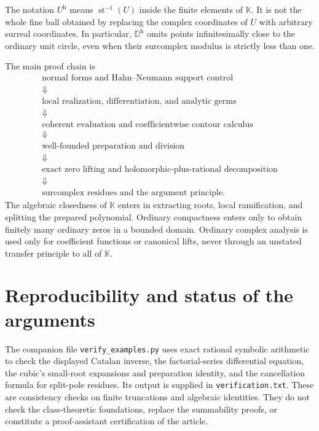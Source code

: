 \documentclass[11pt,a4paper]{article}
\theoremstyle{definition}\newtheorem{definition}[theorem]{Definition}
\theoremstyle{remark}\newtheorem{remark}[theorem]{Remark}
\newcommand{\K}{\mathbb K}
\newcommand{\st}{\operatorname{st}}\newcommand{\supp}{\operatorname{supp}}
\numberwithin{equation}{section}
\begin{document}
The notation $U^{\mathrm h}$ means $\st^{-1}(U)$ inside the finite elements of $\K$. It is not the whole fine ball obtained by replacing the complex coordinates of $U$ with arbitrary surreal coordinates. In particular, $\mathbb D^{\mathrm h}$ omits points infinitesimally close to the ordinary unit circle, even when their surcomplex modulus is strictly less than one.

The main proof chain is
\[
\begin{gathered}
 \text{normal forms and Hahn--Neumann support control}\\
 \Downarrow\\
 \text{local realization, differentiation, and analytic germs}\\
 \Downarrow\\
 \text{coherent evaluation and coefficientwise contour calculus}\\
 \Downarrow\\
 \text{well-founded preparation and division}\\
 \Downarrow\\
 \text{exact zero lifting and holomorphic-plus-rational decomposition}\\
 \Downarrow\\
 \text{surcomplex residues and the argument principle}.
\end{gathered}
\]
The algebraic closedness of $\K$ enters in extracting roots, local ramification, and splitting the prepared polynomial. Ordinary compactness enters only to obtain finitely many ordinary zeros in a bounded domain. Ordinary complex analysis is used only for coefficient functions or canonical lifts, never through an unstated transfer principle to all of $\K$.

\section{Reproducibility and status of the arguments}
The companion file \texttt{verify\_examples.py} uses exact rational symbolic arithmetic to check the displayed Catalan inverse, the factorial-series differential equation, the cubic's small-root expansions and preparation identity, and the cancellation formula for split-pole residues. Its output is supplied in \texttt{verification.txt}. These are consistency checks on finite truncations and algebraic identities. They do not check the class-theoretic foundations, replace the summability proofs, or constitute a proof-assistant certification of the article.
\end{document}
